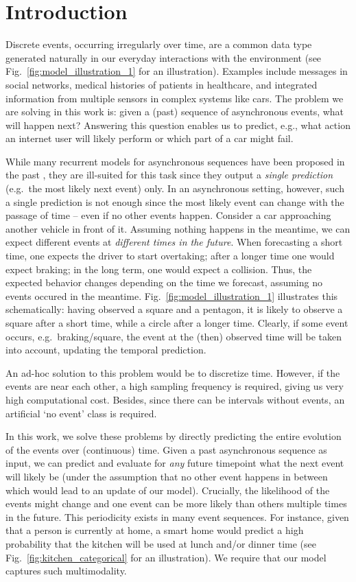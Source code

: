 \section{Introduction}
\label{sec:introduction_010}

Discrete events, occurring irregularly over time, are a common data type generated naturally in our everyday interactions with the environment (see Fig.~\ref{fig:model_illustration_1} for an illustration). Examples include messages in social networks, medical histories of patients in healthcare, and integrated information from multiple sensors in complex systems like cars. The problem we are solving in this work is: given a (past) sequence of asynchronous events, what will happen next? Answering this question enables us to predict, e.g., what action an internet user will likely perform or which part of a car might fail.

While many recurrent models for asynchronous sequences have been proposed in the past \cite{PhasedLstm, RMTPP}, they are ill-suited for this task since they output a \textit{single prediction} (e.g.\ the most likely next event) only. In an asynchronous setting, however, such a single prediction is not enough since the most likely event can change with the passage of time -- even if no other events happen. Consider a car approaching another vehicle in front of it. Assuming nothing happens in the meantime, we can expect different events at \textit{different times in the future}. When forecasting a short time, one expects the driver to start overtaking; after a longer time one would expect braking; in the long term, one would expect a collision. Thus, the expected behavior changes depending on the time we forecast, assuming no events occured in the meantime. Fig.\ \ref{fig:model_illustration_1} illustrates this schematically: having observed a square and a pentagon, it is likely to observe a square after a short time, while a circle after a longer time. Clearly, if some event occurs, e.g.\ braking/square, the event at the (then) observed time will be taken into account, updating the temporal prediction.

An ad-hoc solution to this problem would be to discretize time. However, if the events are near each other, a high sampling frequency is required, giving us very high computational cost. Besides, since there can be intervals without events, an artificial `no event' class is required.

In this work, we solve these problems by directly predicting the entire evolution of the events over (continuous) time. Given a past asynchronous sequence as input, we can predict and evaluate for \textit{any} future timepoint what the next event will likely be (under the assumption that no other event happens in between which would lead to an update of our model). Crucially, the likelihood of the events might change and one event can be more likely than others multiple times in the future. This periodicity exists in many event sequences. For instance, given that a person is currently at home, a smart home would predict a high probability that the kitchen will be used at lunch and/or dinner time (see Fig.\ \ref{fig:kitchen_categorical} for an illustration). We require that our model captures such multimodality.


